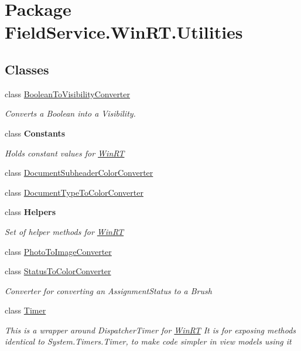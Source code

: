 \hypertarget{namespace_field_service_1_1_win_r_t_1_1_utilities}{\section{Package Field\+Service.\+Win\+R\+T.\+Utilities}
\label{namespace_field_service_1_1_win_r_t_1_1_utilities}
}
\subsection*{Classes}
\begin{DoxyCompactItemize}
\item 
class \hyperlink{class_field_service_1_1_win_r_t_1_1_utilities_1_1_boolean_to_visibility_converter}{Boolean\+To\+Visibility\+Converter}
\begin{DoxyCompactList}\small\item\em Converts a Boolean into a Visibility. \end{DoxyCompactList}\item 
class {\bfseries Constants}
\begin{DoxyCompactList}\small\item\em Holds constant values for \hyperlink{namespace_field_service_1_1_win_r_t}{Win\+R\+T} \end{DoxyCompactList}\item 
class \hyperlink{class_field_service_1_1_win_r_t_1_1_utilities_1_1_document_subheader_color_converter}{Document\+Subheader\+Color\+Converter}
\item 
class \hyperlink{class_field_service_1_1_win_r_t_1_1_utilities_1_1_document_type_to_color_converter}{Document\+Type\+To\+Color\+Converter}
\item 
class {\bfseries Helpers}
\begin{DoxyCompactList}\small\item\em Set of helper methods for \hyperlink{namespace_field_service_1_1_win_r_t}{Win\+R\+T} \end{DoxyCompactList}\item 
class \hyperlink{class_field_service_1_1_win_r_t_1_1_utilities_1_1_photo_to_image_converter}{Photo\+To\+Image\+Converter}
\item 
class \hyperlink{class_field_service_1_1_win_r_t_1_1_utilities_1_1_status_to_color_converter}{Status\+To\+Color\+Converter}
\begin{DoxyCompactList}\small\item\em Converter for converting an Assignment\+Status to a Brush \end{DoxyCompactList}\item 
class \hyperlink{class_field_service_1_1_win_r_t_1_1_utilities_1_1_timer}{Timer}
\begin{DoxyCompactList}\small\item\em This is a wrapper around Dispatcher\+Timer for \hyperlink{namespace_field_service_1_1_win_r_t}{Win\+R\+T} It is for exposing methods identical to System.\+Timers.\+Timer, to make code simpler in view models using it \end{DoxyCompactList}\end{DoxyCompactItemize}
